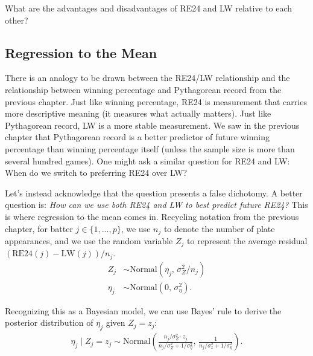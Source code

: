 \documentclass{article}
\begin{document}
        \begin{framed}
           What are the advantages and disadvantages of RE24 and LW relative to each other?
        \end{framed}
    
    \subsection{\sc Regression to the Mean}

      There is an analogy to be drawn between the RE24/LW relationship and the relationship between winning percentage and Pythagorean record from the previous chapter. Just like winning percentage, RE24 is measurement that carries more descriptive meaning (it measures what actually matters). Just like Pythagorean record, LW is a more stable measurement. We saw in the previous chapter that Pythagorean record is a better predictor of future winning percentage than winning percentage itself (unless the sample size is more than several hundred games). One might ask a similar question for RE24 and LW: When do we switch to preferring RE24 over LW?

      Let's instead acknowledge that the question presents a false dichotomy. A better question is: {\it How can we use both RE24 and LW to best predict future RE24?} This is where regression to the mean comes in. Recycling notation from the previous chapter, for batter $j \in \{1, ..., p\}$, we use $n_j$ to denote the number of plate appearances, and we use the random variable $Z_j$ to represent the average residual $(\mbox{RE24}(j) - \mbox{LW}(j)) / n_j$.
      \begin{align*}
        Z_j &\sim \mbox{Normal}(\eta_j,\, \sigma^2_Z / n_j)\\
        \eta_j &\sim \mbox{Normal}(0,\, \sigma^2_\eta).
      \end{align*}

      Recognizing this as a Bayesian model, we can use Bayes' rule to derive the posterior distribution of $\eta_j$ given $Z_j = z_j$:
      \begin{align*}
        \eta_j \mid Z_j = z_j \sim \mbox{Normal}\left(\frac{n_j / \sigma^2_Z \cdot z_j}{n_j / \sigma^2_Z + 1 / \sigma^2_\eta},\, \frac{1}{n_j / \sigma^2_z + 1 / \sigma^2_\eta}\right).
      \end{align*}
\end{document}
